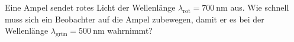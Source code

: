 \begin{ExerciseBlock}
Eine Ampel sendet rotes Licht der Wellenlänge $\lambda_\mathrm{rot}=\qty{700}{\nano\metre}$ aus. Wie schnell muss sich ein Beobachter auf die Ampel zubewegen, damit er es bei der Wellenlänge $\lambda_\mathrm{grün}=\qty{500}{\nano\metre}$ wahrnimmt?
\end{ExerciseBlock}
